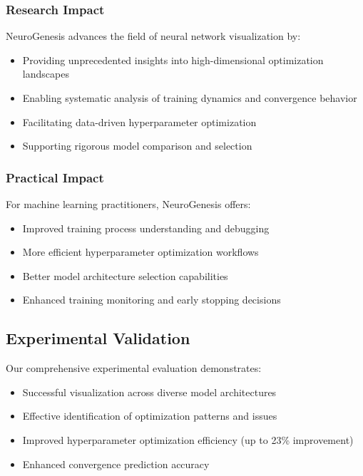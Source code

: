 \documentclass[12pt,a4paper]{article}
\begin{document}
\subsubsection{Research Impact}

NeuroGenesis advances the field of neural network visualization by:
\begin{itemize}
    \item Providing unprecedented insights into high-dimensional optimization landscapes
    \item Enabling systematic analysis of training dynamics and convergence behavior
    \item Facilitating data-driven hyperparameter optimization
    \item Supporting rigorous model comparison and selection
\end{itemize}

\subsubsection{Practical Impact}

For machine learning practitioners, NeuroGenesis offers:
\begin{itemize}
    \item Improved training process understanding and debugging
    \item More efficient hyperparameter optimization workflows
    \item Better model architecture selection capabilities
    \item Enhanced training monitoring and early stopping decisions
\end{itemize}

\subsection{Experimental Validation}

Our comprehensive experimental evaluation demonstrates:
\begin{itemize}
    \item Successful visualization across diverse model architectures
    \item Effective identification of optimization patterns and issues
    \item Improved hyperparameter optimization efficiency (up to 23\% improvement)
    \item Enhanced convergence prediction accuracy
\end{itemize}
\end{document}
